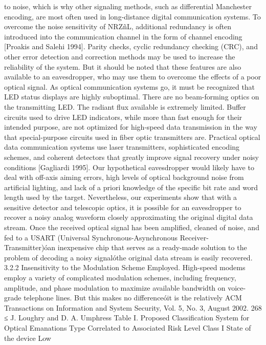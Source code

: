 to noise, which is why other signaling methods, such as differential Manchester 
encoding, are most often used in long-distance digital communication systems. 
To overcome the noise sensitivity of NRZñL, additional redundancy is often 
introduced into the communication channel in the form of channel encoding 
[Proakis and Salehi 1994]. Parity checks, cyclic redundancy checking (CRC), 
and other error detection and correction methods may be used to increase the 
reliability of the system. But it should be noted that these features are also 
available to an eavesdropper, who may use them to overcome the effects of a 
poor optical signal. 
As optical communication systems go, it must be recognized that LED status 
displays are highly suboptimal. There are no beam-forming optics on the transmitting 
LED. The radiant flux available is extremely limited. Buffer circuits 
used to drive LED indicators, while more than fast enough for their intended 
purpose, are not optimized for high-speed data transmission in the way that 
special-purpose circuits used in fiber optic transmitters are. Practical optical 
data communication systems use laser transmitters, sophisticated encoding 
schemes, and coherent detectors that greatly improve signal recovery under 
noisy conditions [Gagliardi 1995]. Our hypothetical eavesdropper would likely 
have to deal with off-axis aiming errors, high levels of optical background noise 
from artificial lighting, and lack of a priori knowledge of the specific bit rate 
and word length used by the target. Nevertheless, our experiments show that 
with a sensitive detector and telescopic optics, it is possible for an eavesdropper 
to recover a noisy analog waveform closely approximating the original digital 
data stream. Once the received optical signal has been amplified, cleaned of 
noise, and fed to a USART (Universal Synchronous-Asynchronous Receiver- 
Transmitter)óan inexpensive chip that serves as a ready-made solution to the 
problem of decoding a noisy signalóthe original data stream is easily recovered. 
3.2.2 Insensitivity to the Modulation Scheme Employed. High-speed 
modems employ a variety of complicated modulation schemes, including frequency, 
amplitude, and phase modulation to maximize available bandwidth on 
voice-grade telephone lines. But this makes no differenceóit is the relatively 
ACM Transactions on Information and System Security, Vol. 5, No. 3, August 2002.
268 ≤ J. Loughry and D. A. Umphress 
Table I. Proposed Classification System for Optical Emanations 
Type Correlated to Associated Risk Level 
Class I State of the device Low 
